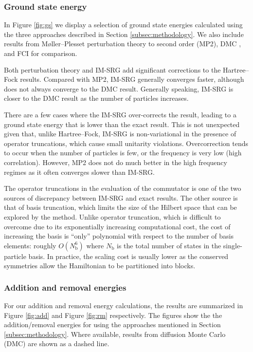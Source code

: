 \subsubsection{Ground state energy}

In Figure \ref{fig:gs} we display a selection of ground state energies calculated using the three approaches described in Section \ref{subsec:methodology}.  We also include results from M\o ller--Plesset perturbation theory to second order (MP2), DMC \cite{hoegberget2013thesis}, and FCI \cite{olsen2013thesis} for comparison.

Both perturbation theory and IM-SRG add significant corrections to the Hartree--Fock results.  Compared with MP2, IM-SRG generally converges faster, although does not always converge to the DMC result.  Generally speaking, IM-SRG is closer to the DMC result as the number of particles increases.

There are a few cases where the IM-SRG over-corrects the result, leading to a ground state energy that is lower than the exact result.  This is not unexpected given that, unlike Hartree--Fock, IM-SRG is non-variational in the presence of operator truncations, which cause small unitarity violations.  Overcorrection tends to occur when the number of particles is few, or the frequency is very low (high correlation).  However, MP2 does not do much better in the high frequency regimes as it often converges slower than IM-SRG.

The operator truncations in the evaluation of the commutator is one of the two sources of discrepancy between IM-SRG and exact results.  The other source is that of basis truncation, which limits the size of the Hilbert space that can be explored by the method.  Unlike operator truncation, which is difficult to overcome due to its exponentially increasing computational cost, the cost of increasing the basis is ``only'' polynomial with respect to the number of basis elements: roughly $O(N_{\mathrm{b}}^6)$ where $N_{\mathrm{b}}$ is the total number of states in the single-particle basis.  In practice, the scaling cost is usually lower as the conserved symmetries allow the Hamiltonian to be partitioned into blocks.

\subsubsection{Addition and removal energies}

For our addition and removal energy calculations, the results are summarized in Figure \ref{fig:add} and Figure \ref{fig:rm} respectively.  The figures show the the addition/removal energies for using the approaches mentioned in Section \ref{subsec:methodology}.  Where available, results from diffusion Monte Carlo (DMC) \cite{PhysRevB.84.115302} are shown as a dashed line.

